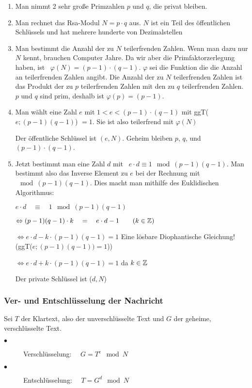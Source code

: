 \documentclass[main.tex]{subfiles}
\begin{document}
\begin{enumerate}
\item Man nimmt 2 sehr große Primzahlen $p$ und $q$, die privat bleiben.
\item Man rechnet das Rsa-Modul $N=p \cdot q$ aus. $N$ ist ein Teil des öffentlichen Schlüssels und hat mehrere hunderte von Dezimalstellen
\item Man bestimmt die Anzahl der zu $N$ teilerfrenden Zahlen. Wenn man dazu nur $N$ kennt, brauchen Computer Jahre. Da wir aber die Primfaktorzerlegung haben, ist \, $\varphi(N) = (p - 1) \cdot (q - 1)$. $\varphi$ sei die Funktion die die Anzahl an teilerfrenden Zahlen angibt. Die Anzahl der zu $N$ teilerfrenden Zahlen ist das Produkt der zu $p$ teilerfrenden Zahlen mit den zu $q$ teilerfrenden Zahlen. $p$ und $q$ sind prim, deshalb ist $\varphi(p)=(p - 1)$.
\item Man wählt eine Zahl $e$ mit $1<e<(p-1)\cdot(q-1)$ mit ggT($e;(p-1)(q-1)$) $= 1$. Sie ist also teilerfrend mit $\varphi(N)$

Der öffentliche Schlüssel ist $(e,N)$. Geheim bleiben $p$, $q$, und $(p - 1) \cdot (q-1)$.
\item Jetzt bestimmt man eine Zahl $d$ mit \, $e \cdot d \equiv 1 \mod (p-1)(q-1)$. Man bestimmt also das Inverse Element zu $e$ bei der Rechnung mit $\mod (p-1)(q-1)$. Dies macht man mithilfe des Euklidischen Algorithmus:

$e \cdot d \quad \equiv \quad 1 \mod (p-1)(q-1) $

$\Leftrightarrow (p-1)(q-1) \cdot k \quad = \quad e \cdot d -1 \qquad (k \in \mathbb{Z})$

$\Leftrightarrow e \cdot d - k \cdot (p-1)(q-1) = 1$ \qquad Eine lösbare Diophantische Gleichung! (ggT($e;(p-1)(q-1)) = 1$))

$\Leftrightarrow e \cdot d + k \cdot (p-1)(q-1) = 1$ \qquad da $k \in \mathbb{Z}$

Der private Schlüssel ist ($d,N$)
\end{enumerate}

\subsubsection{Ver- und Entschlüsselung der Nachricht}

Sei $T$ der Klartext, also der unverschlüsselte Text und $G$ der geheime, verschlüsselte Text.

\begin{description}
	\item[$\bullet$] Verschlüsselung: $\quad G = T^{e} \mod N $
	\item[$\bullet$] Entschlüsselung: $\quad T = G^{d} \mod N $
\end{description}
\end{document}
